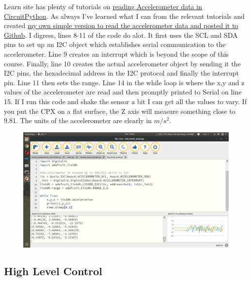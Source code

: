{Learn site has plenty of tutorials
on \href{https://learn.adafruit.com/circuitpython-hardware-lis3dh-accelerometer/software}{reading
Accelerometer data in CircuitPython}. As always I’ve learned what I
can from the relevant tutorials and
created \href{https://github.com/cmontalvo251/Microcontrollers/blob/master/Circuit_Playground/CircuitPython/Accelerometer/low_level_accel.py}{my
own simple version to read the accelerometer data and posted it to
Github}. I digress, lines 8-11 of the code do alot. It first uses the
SCL and SDA pins to set up an I2C object which establishes serial
communication to the accelerometer. Line 9 creates an interrupt which
is beyond the scope of this course. Finally, line 10 creates the
actual accelerometer object by sending it the I2C pins, the
hexadecimal address in the I2C protocol and finally the interrupt
pin. Line 11 then sets the range. Line 14 in the while loop is where
the x,y and z values of the accelerometer are read and then promptly
printed to Serial on line 15. If I run this code and shake the sensor
a bit I can get all the values to vary. If you put the CPX on a flat
surface, the Z axis will measure something close to 9.81. The units of
the accelerometer are clearly in $m/s^2$. 
\begin{figure}[H]
  \begin{center}
    \includegraphics[width=\textwidth]{Figures/accelerometer_mu.png}
  \end{center}
\end{figure}

\subsection{High Level Control}

}
